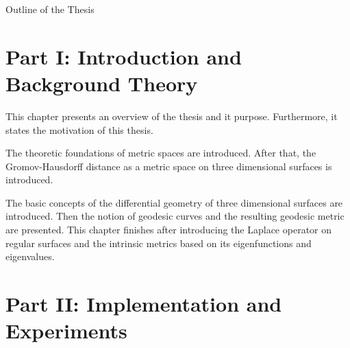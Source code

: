 \clearemptydoublepage

{}

\begin{center}
	\huge{Outline of the Thesis}
\end{center}




\section*{Part I: Introduction and Background Theory}

  \vspace{1mm}

\noindent  This chapter presents an overview of the thesis and it purpose. Furthermore, it states the motivation of this thesis.  \\

  \vspace{1mm}

\noindent  The theoretic foundations of metric spaces are introduced. After that, the Gromov-Hausdorff distance as a metric space on three dimensional surfaces is introduced.   \\

  \vspace{1mm}

\noindent  The basic concepts of the differential geometry of three dimensional surfaces are introduced. Then the notion of geodesic curves and the resulting geodesic metric are presented.
This chapter finishes after introducing the Laplace operator on regular surfaces and the intrinsic metrics based on its eigenfunctions and eigenvalues.\\



\section*{Part II: Implementation and Experiments}

